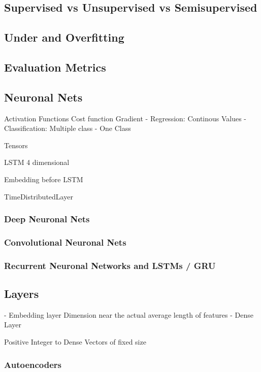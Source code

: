 \subsection{Supervised vs Unsupervised vs Semisupervised}
\subsection{Under and Overfitting}
\subsection{Evaluation Metrics}
\subsection{Neuronal Nets}
Activation Functions
Cost function
Gradient
- Regression: Continous Values
- Classification: Multiple class
- One Class


Tensors

LSTM 4 dimensional

Embedding before LSTM

TimeDistributedLayer
\subsubsection{Deep Neuronal Nets}

\subsubsection{Convolutional Neuronal Nets}
\subsubsection{Recurrent Neuronal Networks and LSTMs / GRU}

\subsection{Layers}

- Embedding layer
    Dimension near the actual average length of features
- Dense Layer

Positive Integer to Dense Vectors of fixed size

\subsubsection{Autoencoders}